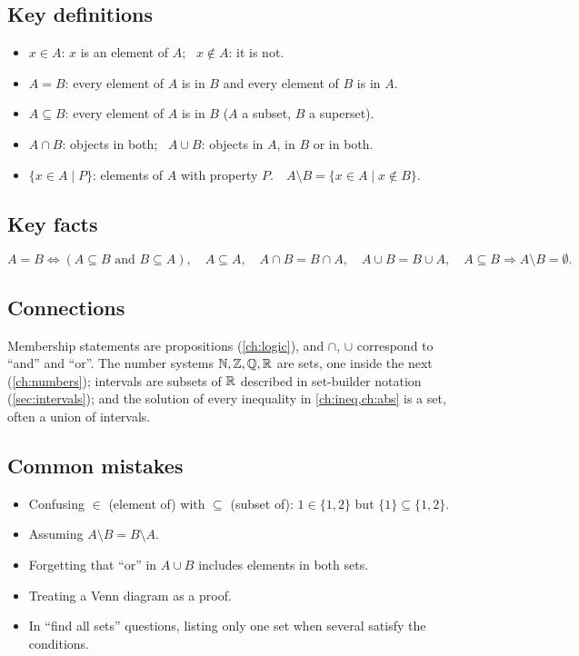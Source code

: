 \subsection*{Key definitions}
\begin{itemize}
  \item $x\in A$: $x$ is an element of $A$; \ $x\notin A$: it is not.
  \item $A=B$: every element of $A$ is in $B$ and every element of $B$ is in $A$.
  \item $A\subseteq B$: every element of $A$ is in $B$ ($A$ a subset, $B$ a superset).
  \item $A\cap B$: objects in both; \ $A\cup B$: objects in $A$, in $B$ or in both.
  \item $\{x\in A\mid P\}$: elements of $A$ with property $P$.\ \ $A\setminus B=\{x\in A\mid x\notin B\}$.
\end{itemize}

\subsection*{Key facts}
\[
A=B\Leftrightarrow(A\subseteq B\text{ and }B\subseteq A),\quad A\subseteq A,\quad
A\cap B=B\cap A,\quad A\cup B=B\cup A,\quad A\subseteq B\Rightarrow A\setminus B=\emptyset.
\]

\subsection*{Connections}
Membership statements are propositions (\cref{ch:logic}), and $\cap$, $\cup$ correspond to ``and'' and
``or''. The number systems $\mathbb{N},\mathbb{Z},\mathbb{Q},\mathbb{R}$ are sets, one inside the next (\cref{ch:numbers}); intervals are
subsets of $\mathbb{R}$ described in set-builder notation (\cref{sec:intervals}); and the solution of every
inequality in \cref{ch:ineq,ch:abs} is a set, often a union of intervals.

\subsection*{Common mistakes}
\begin{itemize}
  \item Confusing $\in$ (element of) with $\subseteq$ (subset of): $1\in\{1,2\}$ but $\{1\}\subseteq\{1,2\}$.
  \item Assuming $A\setminus B=B\setminus A$.
  \item Forgetting that ``or'' in $A\cup B$ includes elements in both sets.
  \item Treating a Venn diagram as a proof.
  \item In ``find all sets'' questions, listing only one set when several satisfy the conditions.
\end{itemize}

